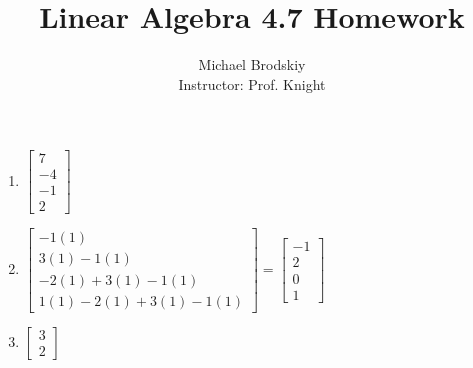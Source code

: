 \documentclass[12pt]{article}
\title{Linear Algebra 4.7 Homework}
\date{}
\author{Michael Brodskiy\\ \small Instructor: Prof. Knight}
\begin{document}
\maketitle

\begin{enumerate}

    \begin{center}
    \underline{Problems 3, 9, 11, 13, 17, 19, 21, 23, 35, 37, 43, 45, 51}
    \end{center}

    \setcounter{enumi}{2}

  \item $\begin{bmatrix}7\\-4\\-1\\2 \end{bmatrix}$

    \setcounter{enumi}{8}

  \item $\begin{bmatrix} -1(1)\\ 3(1)-1(1)\\ -2(1)+3(1)-1(1)\\ 1(1)-2(1)+3(1)-1(1)  \end{bmatrix}=\begin{bmatrix}-1\\2\\0\\1\end{bmatrix}$

    \setcounter{enumi}{10}

  \item $\begin{bmatrix} 3\\2\end{bmatrix}$

    \setcounter{enumi}{12}


\end{enumerate}
\end{document}
